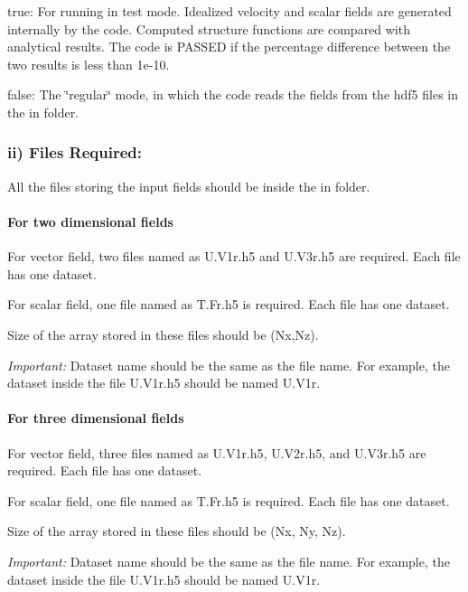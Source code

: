 {\ttfamily true}\-: For running in test mode. Idealized velocity and scalar fields are generated internally by the code. Computed structure functions are compared with analytical results. The code is P\-A\-S\-S\-E\-D if the percentage difference between the two results is less than {\ttfamily 1e-\/10}.

{\ttfamily false}\-: The \char`\"{}regular\char`\"{} mode, in which the code reads the fields from the hdf5 files in the {\ttfamily in} folder.

\subsubsection*{ii) Files Required\-:}

All the files storing the input fields should be inside the {\ttfamily in} folder.

\paragraph*{For two dimensional fields}

For vector field, two files named as {\ttfamily U.\-V1r.\-h5} and {\ttfamily U.\-V3r.\-h5} are required. Each file has one dataset.

For scalar field, one file named as {\ttfamily T.\-Fr.\-h5} is required. Each file has one dataset.

Size of the array stored in these files should be ({\ttfamily Nx,Nz}).

{\itshape Important\-:} Dataset name should be the same as the file name. For example, the dataset inside the file {\ttfamily U.\-V1r.\-h5} should be named {\ttfamily U.\-V1r}.

\paragraph*{For three dimensional fields}

For vector field, three files named as {\ttfamily U.\-V1r.\-h5}, {\ttfamily U.\-V2r.\-h5}, and {\ttfamily U.\-V3r.\-h5} are required. Each file has one dataset.

For scalar field, one file named as {\ttfamily T.\-Fr.\-h5} is required. Each file has one dataset.

Size of the array stored in these files should be ({\ttfamily Nx, Ny, Nz}).

{\itshape Important\-:} Dataset name should be the same as the file name. For example, the dataset inside the file {\ttfamily U.\-V1r.\-h5} should be named {\ttfamily U.\-V1r}.

